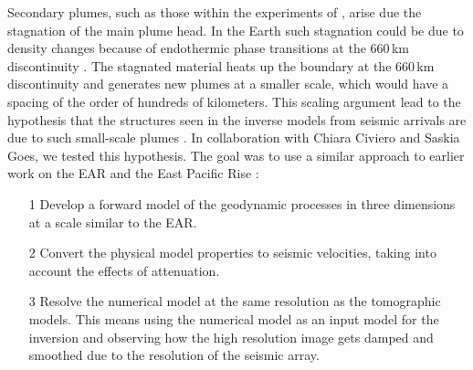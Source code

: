 Secondary plumes, such as those within the experiments of \cite{kumagai-etal-2007}, arise due the stagnation of the main plume head. In the Earth such stagnation could be due to density changes because of endothermic phase transitions at the 660\,km discontinuity \citep[e.g.][]{tosi-2011,bossmann-2013}. The stagnated material heats up the boundary at the 660\,km discontinuity and generates new plumes at a smaller scale, which would have a spacing of the order of hundreds of kilometers. This scaling argument lead to the hypothesis that the structures seen in the inverse models from seismic arrivals are due to such small-scale plumes \citep{civiero-etal-2015}. In collaboration with Chiara Civiero and Saskia Goes, we tested this hypothesis. The goal was to use a similar approach to earlier work on the EAR and the East Pacific Rise \citep{armitage-etal-2015,goes-etal-2012}:
\begin{itemize}
\item[1] Develop a forward model of the geodynamic processes in three dimensions at a scale similar to the EAR.
\item[2] Convert the physical model properties to seismic velocities, taking into account the effects of attenuation.
\item[3] Resolve the numerical model at the same resolution as the tomographic models. This means using the numerical model as an input model for the inversion and observing how the high resolution image gets damped and smoothed due to the resolution of the seismic array.
\end{itemize}

